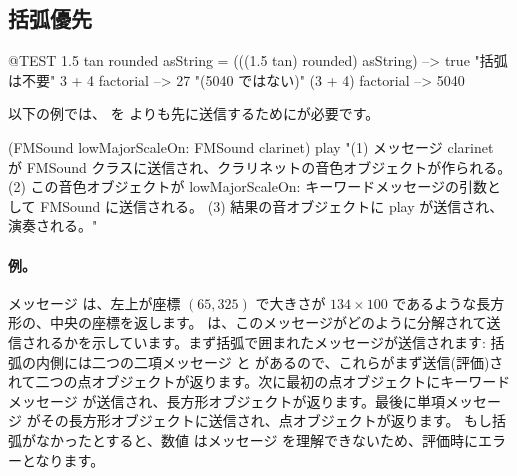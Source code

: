 \documentclass[a4paper,10pt,twoside]{book}
\begin{document}
\subsection{括弧優先}


\begin{code}{@TEST}
1.5 tan rounded asString = (((1.5 tan) rounded) asString) --> true    "括弧は不要"
3 + 4 factorial   --> 27    "(5040 ではない)"
(3 + 4) factorial --> 5040
\end{code}

以下の例では、 を  よりも先に送信するためにが必要です。
\begin{code}{}
(FMSound lowMajorScaleOn: FMSound clarinet) play 
"(1) メッセージ clarinet が FMSound クラスに送信され、クラリネットの音色オブジェクトが作られる。
 (2) この音色オブジェクトが lowMajorScaleOn: キーワードメッセージの引数として FMSound に送信される。
 (3) 結果の音オブジェクトに play が送信され、演奏される。"
\end{code}



\paragraph{例。}
メッセージ  は、左上が座標 $(65, 325)$ で大きさが $134{\times}100$ であるような長方形の、中央の座標を返します。 は、このメッセージがどのように分解されて送信されるかを示しています。まず括弧で囲まれたメッセージが送信されます: 括弧の内側には二つの二項メッセージ  と  があるので、これらがまず送信(評価)されて二つの点オブジェクトが返ります。次に最初の点オブジェクトにキーワードメッセージ  が送信され、長方形オブジェクトが返ります。最後に単項メッセージ  がその長方形オブジェクトに送信され、点オブジェクトが返ります。
もし括弧がなかったとすると、数値  はメッセージ  を理解できないため、評価時にエラーとなります。
\end{document}
